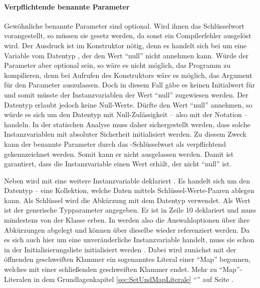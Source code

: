 \paragraph{Verpflichtende benannte Parameter}

Gewöhnliche benannte Parameter sind optional.
Wird ihnen das Schlüsselwort  vorangestellt, so müssen sie gesetz werden,
da sonst ein Compilerfehler ausgelöst wird.
Der Ausdruck  ist im Konstruktor nötig, denn es handelt sich bei  um eine Variable vom Datentyp ,
der den Wert \enquote{null} nicht annehmen kann.
Würde der Parameter aber optional sein, so wäre es nicht möglich, das Programm zu kompilieren,
denn bei Aufrufen des Konstruktors wäre es möglich, das Argument für den Parameter auszulassen.
Doch in diesem Fall gäbe es keinen Initialwert für  und somit müsste der Instanzvariablen der Wert \enquote{null} zugewiesen werden.
Der Datentyp  erlaubt jedoch keine Null-Werte.
Dürfte  den Wert \enquote{null} annehmen, so würde es sich um den Datentyp  mit Null-Zulässigkeit -- also mit der Notation  -- handeln.
In der statischen Analyse muss daher sichergestellt werden,
dass solche Instanzvariablen mit absoluter Sicherheit initialisiert werden.
Zu diesem Zweck kann der benannte Parameter durch das -Schlüsselwort als verpflichtend gekennzeichnet werden.
Somit kann er nicht ausgelassen werden.
Damit ist garantiert, dass die Instanzvariable  einen Wert erhält,  der nicht \enquote{null} ist.  

Neben  wird mit  eine weitere Instanzvariable deklariert .
Es handelt sich um den Datentyp  -- eine Kollektion, welche Daten mittels Schlüssel-Werte-Paaren ablegen kann.
Als Schlüssel wird die Abkürzung mit dem Datentyp  verwendet.
Als Wert ist der generische Typparameter  angegeben.
Er ist in Zeile 10 deklariert und muss mindestens von der Klasse  erben.
In  werden also die Auswahloptionen über  ihre Abkürzungen abgelegt und können über dieselbe wieder referenziert werden.
 Da es sich auch hier um eine unveränderliche Instanzvariable handelt, muss sie schon in der Initialisierungsliste initialisiert werden .
Dabei wird zunächst mit der öffnenden geschweiften Klammer  ein sogenanntes Literal einer \enquote{Map}  begonnen, welches mit einer schließenden geschweiften Klammer  endet.
Mehr zu \enquote{Map}-Literalen in dem Grundlagenkapitel \ref{sec:SetUndMapLiterale} \enquote{} auf Seite \pageref{sec:SetUndMapLiterale}.



